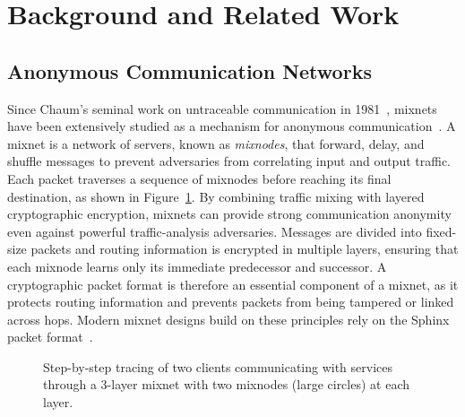 \section{Background and Related Work}\label{sec:related}

\subsection{Anonymous Communication Networks}

Since Chaum's seminal work on untraceable communication in 1981~\cite{chaum-mix}, mixnets have been extensively studied as a mechanism for anonymous communication~\cite{piotrowska2017loopix, van2015vuvuzela, kwon2020xrd, lazar2018karaoke, cottrell1995mixmaster, alexopoulos2017MCMIX, chaum2016cmix, chaum-mix, danezis2003mixminion}.
A mixnet is a network of servers, known as \emph{mixnodes}, that forward, delay, and shuffle messages to prevent adversaries from correlating input and output traffic. 
Each packet traverses a sequence of mixnodes before reaching its final destination, as shown in Figure~\ref{fig:mixnet}. By combining traffic mixing with layered cryptographic encryption, mixnets can provide strong communication anonymity even against powerful traffic-analysis adversaries. Messages are divided into fixed-size packets and routing information is encrypted in multiple layers, ensuring that each mixnode learns only its immediate predecessor and successor. A cryptographic packet format is therefore an essential component of a mixnet, as it protects routing information and prevents packets from being tampered or linked across hops. 
Modern mixnet designs build on these principles rely on the Sphinx packet format~\cite{sphinx}.

\begin{figure}%
	\hspace{-9mm}
	\resizebox{1.085\linewidth}{!}{}
	\caption{Step-by-step tracing of two clients communicating with services through a 3-layer mixnet with two mixnodes (large circles) at each layer.}
	\label{fig:mixnet}
\end{figure}

